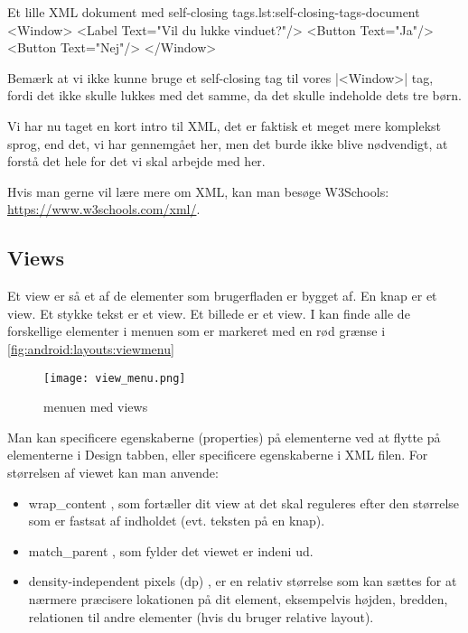 \begin{example}
	\begin{XmlCode}{Et lille XML dokument med self-closing tags.}{lst:self-closing-tags-document}
		<Window>
			<Label Text="Vil du lukke vinduet?"/>
			<Button Text="Ja"/>
			<Button Text="Nej"/>
		</Window>
	\end{XmlCode}
\end{example}

\begin{remark}
	Bemærk at vi ikke kunne bruge et self-closing tag til vores \XmlInline|<Window>| tag, fordi det ikke skulle lukkes med det samme, da det skulle indeholde dets tre børn.
\end{remark}

Vi har nu taget en kort intro til XML, det er faktisk et meget mere komplekst sprog, end det, vi har gennemgået her, men det burde ikke blive nødvendigt, at forstå det hele for det vi skal arbejde med her.

Hvis man gerne vil lære mere om XML, kan man besøge W3Schools: \url{https://www.w3schools.com/xml/}.

\subsection{Views}
Et view er så et af de elementer som brugerfladen er bygget af. En knap er et view. Et stykke tekst er et view. Et billede er et view. I kan finde alle de forskellige elementer i menuen som er markeret med en rød grænse i \autoref{fig:android:layouts:viewmenu}

\begin{figure}[h]
	\begin{center}
		\texttt{[image: view\_menu.png]}
		\caption{menuen med views}
		\label{fig:android:layouts:viewmenu}
	\end{center}
\end{figure}

Man kan specificere egenskaberne (properties) på elementerne ved at flytte på elementerne i Design tabben, eller specificere egenskaberne i XML filen. For størrelsen af viewet kan man anvende:
\begin{itemize}
	\item wrap\_content , som fortæller dit view at det skal reguleres efter den størrelse som er fastsat af indholdet (evt. teksten på en knap).
	\item match\_parent , som fylder det viewet er indeni ud.\\
	\item density-independent pixels (dp) , er en relativ størrelse som kan sættes for at nærmere præcisere lokationen på dit element, eksempelvis højden, bredden, relationen til andre elementer (hvis du bruger relative layout).
\end{itemize}

